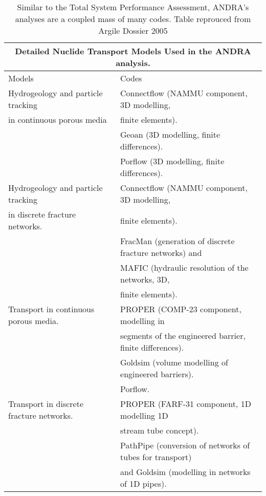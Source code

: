 \begin{table}
\centering
\footnotesize{
\begin{tabular}{|l|l|}
  \multicolumn{2}{c}{\textbf{Detailed Nuclide Transport Models Used in the ANDRA analysis.}}\\
\hline
Models &                                          Codes\\
\hline
Hydrogeology and particle tracking      & Connectflow (NAMMU component, 3D modelling,\\
in continuous porous media              &  finite elements).\\
                                        &  Geoan (3D modelling, finite differences).\\
                                        &  Porflow (3D modelling, finite differences).\\
Hydrogeology and particle tracking      &  Connectflow (NAMMU component, 3D modelling,\\
in discrete fracture networks.          &  finite elements).\\
                                        &  FracMan (generation of discrete fracture networks) and\\
                                        &  MAFIC (hydraulic resolution of the networks, 3D,\\
                                        &  finite elements).\\
Transport in continuous porous media.   &  PROPER (COMP-23 component, modelling in\\
                                        &  segments of the engineered barrier, finite differences).\\
                                        &  Goldsim (volume modelling of engineered barriers).\\
                                        &  Porflow.\\
Transport in discrete fracture networks.&  PROPER (FARF-31 component, 1D modelling 1D\\
                                        &  stream tube concept).\\
                                        &  PathPipe (conversion of networks of tubes for transport)\\
                                        &  and Goldsim (modelling in networks of 1D pipes).\\
\hline
\end{tabular}
\caption[Particle Transport Codes Used in ANDRA Assessment]{Similar to the Total System Performance Assessment, ANDRA's analyses are a coupled mass of many codes. Table reprouced from Argile Dossier 2005 \cite{andra_argile:_2005}}
\label{tab:andra}
}
\end{table}
